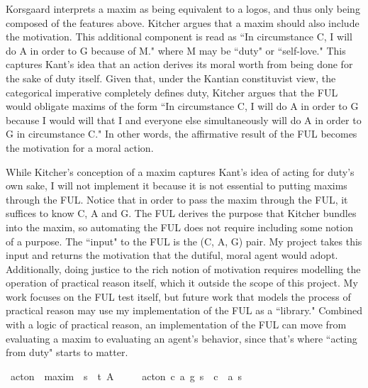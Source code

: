 \begin{isabellebody}
{Korsgaard interprets a maxim as being equivalent to a logos, and thus only being composed of the features
above. Kitcher argues that a maxim should also include the motivation. This additional component is read 
as ``In circumstance C, I will do A in order to G because of M." where M may be ``duty" or ``self-love."
This captures Kant's idea that an action derives its moral worth from being done for the sake of duty itself.
Given that, under the Kantian constituvist view, the categorical
imperative completely defines duty, Kitcher argues that the FUL would obligate maxims of the form 
``In circumstance C, I will do A in order to G because I would will that I and everyone else simultaneously
will do A in order to G in circumstance C." In other words, the affirmative result of the FUL becomes 
the motivation for a moral action.

While Kitcher's conception of a maxim captures Kant's idea of acting for duty's own sake, I will not implement it 
because it is not essential to putting maxims through the FUL. 
Notice that in order to pass the maxim through the FUL, it suffices to know C, A and G. The FUL
derives the purpose that Kitcher bundles into the maxim, so automating the FUL does not require 
including some notion of a purpose. The ``input" to the FUL is the (C, A, G) pair. My project takes 
this input and returns the motivation that the dutiful, moral agent would adopt. Additionally, doing
justice to the rich notion of motivation requires modelling the operation of practical reason itself, 
which it outside the scope of this project. My work focuses on the FUL test itself, but future work that 
models the process of practical reason may use my implementation of the FUL as a ``library." Combined 
with a logic of practical reason, an implementation of the FUL can move from evaluating a maxim to 
evaluating an agent's behavior, since that's where ``acting from duty" starts to matter.%
}\isanewline
\isanewline
{}\isamarkupfalse%
\ act{\isacharunderscore}on\ {\isacharcolon}{\isacharcolon}\ {\isachardoublequoteopen}maxim\ {\isasymRightarrow}\ s{\isasymRightarrow}\ \ t{\isachardoublequoteclose}\ {\isacharparenleft}{\isachardoublequoteopen}A\ {\isacharunderscore}\ {\isacharunderscore}{\isachardoublequoteclose}{\isacharparenright}\isanewline
\ \ \ {\isachardoublequoteopen}act{\isacharunderscore}on\ {\isacharparenleft}c{\isacharcomma}\ a{\isacharcomma}\ g{\isacharparenright}\ s\ {\isacharequal}\ {\isacharparenleft}c\ \isactrlbold {\isasymrightarrow}\ {\isacharparenleft}a\ s{\isacharparenright}{\isacharparenright}{\isachardoublequoteclose}\isanewline
\ %
\end{isabellebody}
